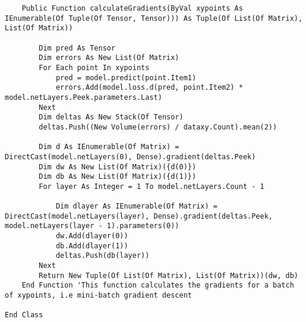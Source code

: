 \begin{verbatim}
    Public Function calculateGradients(ByVal xypoints As IEnumerable(Of Tuple(Of Tensor, Tensor))) As Tuple(Of List(Of Matrix), List(Of Matrix))

        Dim pred As Tensor
        Dim errors As New List(Of Matrix)
        For Each point In xypoints
            pred = model.predict(point.Item1)
            errors.Add(model.loss.d(pred, point.Item2) * model.netLayers.Peek.parameters.Last)
        Next
        Dim deltas As New Stack(Of Tensor)
        deltas.Push((New Volume(errors) / dataxy.Count).mean(2))

        Dim d As IEnumerable(Of Matrix) = DirectCast(model.netLayers(0), Dense).gradient(deltas.Peek)
        Dim dw As New List(Of Matrix)({d(0)})
        Dim db As New List(Of Matrix)({d(1)})
        For layer As Integer = 1 To model.netLayers.Count - 1

            Dim dlayer As IEnumerable(Of Matrix) = DirectCast(model.netLayers(layer), Dense).gradient(deltas.Peek, model.netLayers(layer - 1).parameters(0))
            dw.Add(dlayer(0))
            db.Add(dlayer(1))
            deltas.Push(db(layer))
        Next
        Return New Tuple(Of List(Of Matrix), List(Of Matrix))(dw, db)
    End Function 'This function calculates the gradients for a batch of xypoints, i.e mini-batch gradient descent

End Class
\end{verbatim}